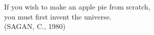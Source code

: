 
\begin{epigrafe}
  If you wish to make an apple pie from scratch, \\
  you must first invent the universe. \\
  (SAGAN, C., 1980)
\end{epigrafe}

